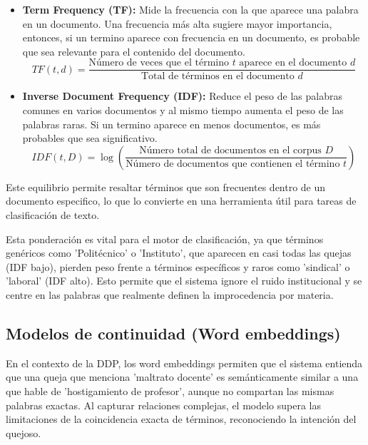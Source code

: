 \begin{itemize}
    \item \textbf{Term Frequency (TF):} Mide la frecuencia con la que aparece una palabra en un documento. Una frecuencia más alta sugiere mayor importancia, entonces, si un termino aparece con frecuencia en un documento, es probable que sea relevante para el contenido del documento.
    \begin{equation}
    TF(t,d) = \frac{\text{Número de veces que el término } t \text{ aparece en el documento } d}{\text{Total de términos en el documento } d}
    \end{equation}
    \item \textbf{Inverse Document Frequency (IDF):} Reduce el peso de las palabras comunes en varios documentos y al mismo tiempo aumenta el peso de las palabras raras. Si un termino aparece en menos documentos, es más probables que sea significativo.
    \begin{equation}
    IDF(t, D) = \log\left(\frac{\text{Número total de documentos en el corpus } D}{\text{Número de documentos que contienen el término } t}\right)
    \end{equation}
\end{itemize}
Este equilibrio permite resaltar términos que son frecuentes dentro de un documento especifico, lo que lo convierte en una herramienta útil para tareas de clasificación de texto. 

Esta ponderación es vital para el motor de clasificación, ya que términos genéricos como 'Politécnico' o 'Instituto', que aparecen en casi todas las quejas (IDF bajo), pierden peso frente a términos específicos y raros como 'sindical' o 'laboral' (IDF alto). Esto permite que el sistema ignore el ruido institucional y se centre en las palabras que realmente definen la improcedencia por materia.

\subsection{Modelos de continuidad (Word embeddings)}

En el contexto de la DDP, los word embeddings permiten que el sistema entienda que una queja que menciona 'maltrato docente' es semánticamente similar a una que hable de 'hostigamiento de profesor', aunque no compartan las mismas palabras exactas. Al capturar relaciones complejas, el modelo supera las limitaciones de la coincidencia exacta de términos, reconociendo la intención del quejoso.

